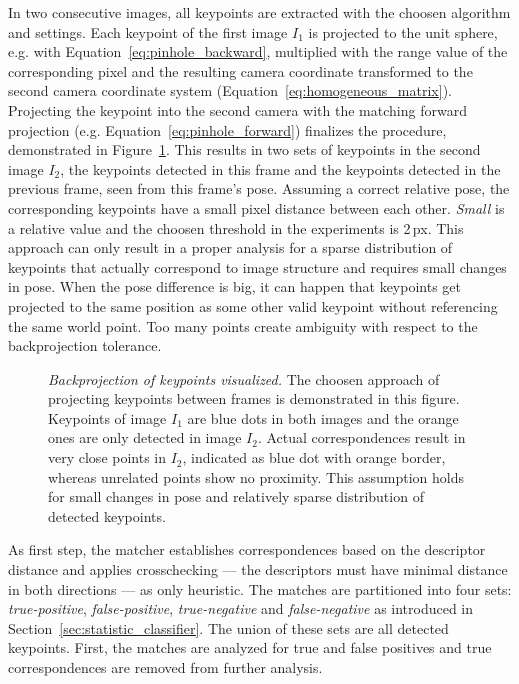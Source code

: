 In two consecutive images, all keypoints are extracted with the choosen algorithm and settings.
Each keypoint of the first image $I_1$ is projected to the unit sphere, e.g. with Equation~\ref{eq:pinhole_backward}, multiplied with the range value of the corresponding pixel and the resulting camera coordinate transformed to the second camera coordinate system (Equation~\ref{eq:homogeneous_matrix}).
Projecting the keypoint into the second camera with the matching forward projection (e.g. Equation~\ref{eq:pinhole_forward}) finalizes the procedure, demonstrated in Figure~\ref{fig:keypoint_projection}.
This results in two sets of keypoints in the second image $I_2$, the keypoints detected in this frame and the keypoints detected in the previous frame, seen from this frame's pose.
Assuming a correct relative pose, the corresponding keypoints have a small pixel distance between each other.
\emph{Small} is a relative value and the choosen threshold in the experiments is 2\,px.
This approach can only result in a proper analysis for a sparse distribution of keypoints that actually correspond to image structure and requires small changes in pose.
When the pose difference is big, it can happen that keypoints get projected to the same position as some other valid keypoint without referencing the same world point.
Too many points create ambiguity with respect to the backprojection tolerance.
\begin{figure}[H]
    
    \caption[Backprojection of keypoints visualized]{\emph{Backprojection of keypoints visualized.} The choosen approach of projecting keypoints between frames is demonstrated in this figure. Keypoints of image $I_1$ are blue dots in both images and the orange ones are only detected in image $I_2$. Actual correspondences result in very close points in $I_2$, indicated as blue dot with orange border, whereas unrelated points show no proximity. This assumption holds for small changes in pose and relatively sparse distribution of detected keypoints.}\label{fig:keypoint_projection}
\end{figure}
\pagebreak[4]
As first step, the matcher establishes correspondences based on the descriptor distance and applies crosschecking --- the descriptors must have minimal distance in both directions --- as only heuristic.
The matches are partitioned into four sets: \emph{true-positive}, \emph{false-positive}, \emph{true-negative} and \emph{false-negative} as introduced in Section~\ref{sec:statistic_classifier}.
The union of these sets are all detected keypoints.
First, the matches are analyzed for true and false positives and true correspondences are removed from further analysis. 
